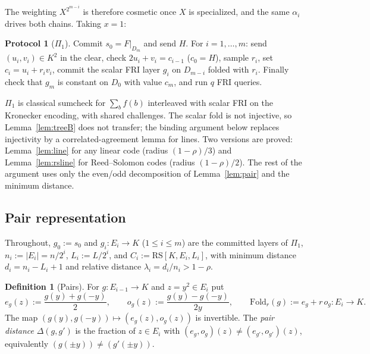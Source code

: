 \documentclass[11pt]{article}
\theoremstyle{definition}
\newtheorem{definition}[theorem]{Definition}
\newtheorem{protocol}[theorem]{Protocol}
\newcommand{\K}{K}
\newcommand{\RS}{\mathrm{RS}}
\newcommand{\Fold}{\mathrm{Fold}}
\begin{document}
The weighting $X^{2^{m-i}}$ is therefore cosmetic once $X$ is specialized, and the same $\alpha_i$ drives both chains. Taking $x=1$:

\begin{protocol}[$\Pi_1$]\label{prot:one}
Commit $s_0=F|_{D_m}$ and send $H$. For $i=1,\dots,m$: send $(u_i,v_i)\in\K^2$ in the clear, check $2u_i+v_i=c_{i-1}$ ($c_0=H$), sample $r_i$, set $c_i=u_i+r_iv_i$, commit the scalar FRI layer $g_i$ on $D_{m-i}$ folded with $r_i$. Finally check that $g_m$ is constant on $D_0$ with value $c_m$, and run $q$ FRI queries.
\end{protocol}

$\Pi_1$ is classical sumcheck for $\sum_bf(b)$ interleaved with scalar FRI on the Kronecker encoding, with shared challenges. The scalar fold is not injective, so Lemma~\ref{lem:treeB} does not transfer; the binding argument below replaces injectivity by a correlated-agreement lemma for lines. Two versions are proved: Lemma~\ref{lem:line} for any linear code (radius $(1-\rho)/3$) and Lemma~\ref{lem:rsline} for Reed--Solomon codes (radius $(1-\rho)/2$). The rest of the argument uses only the even/odd decomposition of Lemma~\ref{lem:pair} and the minimum distance.

\subsection{Pair representation}

Throughout, $g_0:=s_0$ and $g_i:E_i\to\K$ ($1\le i\le m$) are the committed layers of $\Pi_1$, $n_i:=|E_i|=n/2^i$, $L_i:=L/2^i$, and $C_i:=\RS[\K,E_i,L_i]$, with minimum distance $d_i=n_i-L_i+1$ and relative distance $\lambda_i=d_i/n_i>1-\rho$.

\begin{definition}[Pairs]
For $g:E_{i-1}\to\K$ and $z=y^2\in E_i$ put
\[
e_g(z):=\frac{g(y)+g(-y)}2,\qquad o_g(z):=\frac{g(y)-g(-y)}{2y},\qquad \Fold_r(g):=e_g+r\,o_g:E_i\to\K .
\]
The map $(g(y),g(-y))\mapsto(e_g(z),o_g(z))$ is invertible. The \emph{pair distance} $\Delta(g,g')$ is the fraction of $z\in E_i$ with $(e_g,o_g)(z)\ne(e_{g'},o_{g'})(z)$, equivalently $(g(\pm y))\ne(g'(\pm y))$.
\end{definition}
\end{document}
